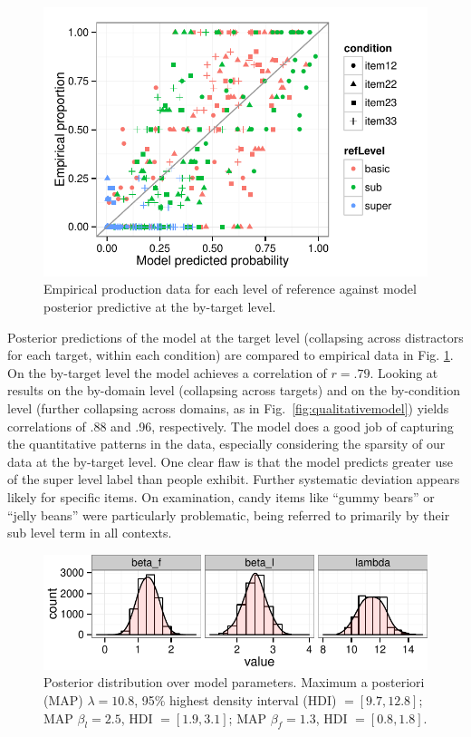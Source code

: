 \documentclass[10pt,letterpaper]{article}
\newcommand{\figref}[1]{Fig.~\ref{#1}}
\begin{document}
\begin{figure}[t!]
\centering
\includegraphics[width=.45\textwidth]{graphs/scatterplot}
\caption{Empirical production data for each level of reference against model posterior predictive at the by-target level.}
 \label{fig:scatterplot}
\end{figure}

Posterior predictions of the model at the target level (collapsing across distractors for each target, within each condition) are compared to empirical data in Fig. \ref{fig:scatterplot}. On the by-target level the model achieves a correlation of $r = .79$. Looking at results on the by-domain level (collapsing across targets) and on the by-condition level (further collapsing across domains, as in \figref{fig:qualitativemodel}) yields correlations of .88 and .96, respectively. 
The model does a good job of capturing the quantitative patterns in the data, especially considering the sparsity of our data at the by-target level.
One clear flaw is that the model predicts greater use of the super level label than people exhibit.
Further systematic deviation appears likely for specific items. 
On examination, candy items like ``gummy bears'' or ``jelly beans'' were particularly problematic, being referred to primarily by their sub level term in all contexts.

\begin{figure}
\includegraphics[width=.45\textwidth]{graphs/parameterposteriors.pdf}
\caption{Posterior distribution over model parameters. Maximum a posteriori (MAP) $\lambda = 10.8$, 95\% highest density interval (HDI) $= [9.7, 12.8]$; MAP $\beta_l = 2.5$, HDI $= [1.9, 3.1]$; MAP $\beta_f = 1.3$, HDI $= [0.8, 1.8]$.}
\label{fig:paramposteriors}
\end{figure}
\end{document}
